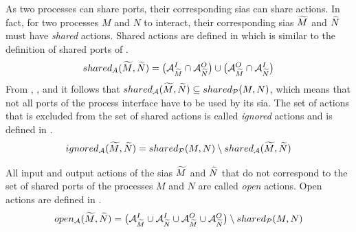 As two processes can share ports, their corresponding \glspl{sia} can share actions.
In fact, for two processes $M$ and $N$ to interact, their corresponding \glspl{sia} $\widetilde{M}$ and $\widetilde{N}$ must have \emph{shared} actions.
Shared actions are defined in \Equ{\ref{eq_shared_actions}} which is similar to the definition of shared ports of \Equ{\ref{eq_shared_ports}}.
\begin{equation}
    \label{eq_shared_actions}
    shared_{A}(\widetilde{M}, \widetilde{N}) = \big ( \mathcal{A}_{\widetilde{M}}^I \cap \mathcal{A}_{\widetilde{N}}^O \big ) \cup \big (\mathcal{A}_{\widetilde{M}}^O \cap \mathcal{A}_{\widetilde{N}}^I \big )
\end{equation}
From \Equ{\ref{eq_shared_ports}}, \Equ{\ref{eq_pi_ai}}, and \Equ{\ref{eq_po_ao}} it follows that $shared_{\mathcal{A}}(\widetilde{M}, \widetilde{N}) \subseteq shared_{\mathcal{P}}(M, N)$, which means that not all ports of the process interface have to be used by its \gls{sia}.
The set of actions that is excluded from the set of shared actions is called \emph{ignored} actions and is defined in \Equ{\ref{eq_ignored_actions}}.
\begin{equation}
    \label{eq_ignored_actions}
    ignored_{\mathcal{A}}(\widetilde{M}, \widetilde{N}) = shared_{\mathcal{P}}(M, N) \setminus shared_{\mathcal{A}}(\widetilde{M}, \widetilde{N})
\end{equation}

All input and output actions of the \glspl{sia} $\widetilde{M}$ and $\widetilde{N}$ that do not correspond to the set of shared ports of the processes $M$ and $N$ are called \emph{open} actions.
Open actions are defined in \Equ{\ref{eq_open_actions}}.
\begin{equation}
    \label{eq_open_actions}
    open_{\mathcal{A}}(\widetilde{M},\widetilde{N}) = \big ( \mathcal{A}_{\widetilde{M}}^I \cup \mathcal{A}_{\widetilde{N}}^I \cup \mathcal{A}_{\widetilde{M}}^O \cup \mathcal{A}_{\widetilde{N}}^O \big ) \setminus shared_{\mathcal{P}}(M, N)
\end{equation}

